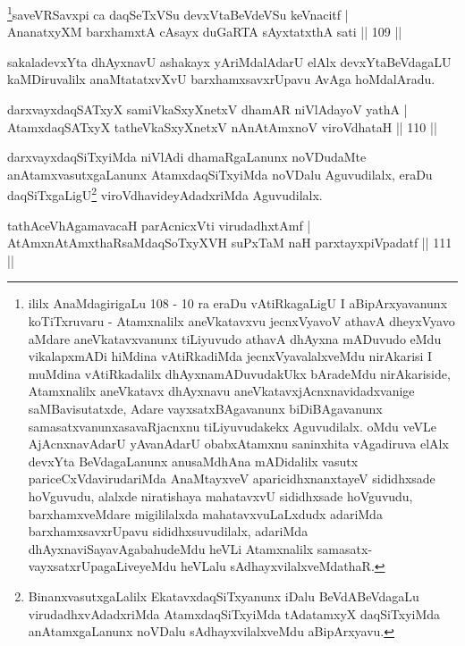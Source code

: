 \begin{shl}
\footnote{ililx AnaMdagirigaLu 108 - 10 ra eraDu vAtiRkagaLigU I aBipArxyavanunx koTiTxruvaru - Atamxnalilx aneVkatavxvu jecnxVyavoV athavA dheyxVyavo aMdare aneVkatavxvanunx tiLiyuvudo athavA dhAyxna mADuvudo eMdu vikalapxmADi hiMdina vAtiRkadiMda jecnxVyavalalxveMdu nirAkarisi I muMdina vAtiRkadalilx dhAyxnamADuvudakUkx bAradeMdu nirAkariside, Atamxnalilx aneVkatavx dhAyxnavu aneVkatavxjAcnxnavidadxvanige saMBavisutatxde, Adare vayxsatxBAgavanunx biDiBAgavanunx samasatxvanunx\break asavaRjacnxnu tiLiyuvudakekx Aguvudilalx. oMdu veVLe AjAcnxnavAdarU yAvanAdarU obabxAtamxnu saninxhita vAgadiruva elAlx devxYta BeVdagaLanunx anusaMdhAna mADidalilx vasutx pariceCxVdavirudariMda AnaMtayxveV aparicidhxnanxtayeV sididhxsade hoVguvudu, alalxde niratishaya mahatavxvU sididhxsade hoVguvudu, barxhamxveMdare migililalxda mahatavxvuLaLxdudx adariMda barxhamxsavxrUpavu sididhxsuvudilalx, adariMda dhAyxnaviSaya\-vAgabahudeMdu heVLi Atamxnalilx samasatx-vayxsatxrUpagaLiveyeMdu heVLalu sAdhayxvilalxveMdathaR.}saveVRSavxpi ca daqSeTxVSu devxVtaBeVdeVSu keVnacitf |\\
AnanatxyXM barxhamxtA cAsayx duGaRTA sAyxtatxthA sati \hfill || 109 ||
\end{shl}

\begin{artha}
sakaladevxYta dhAyxnavU ashakayx yAriMdalAdarU elAlx devxYtaBeVdagaLU kaMDiruvalilx anaMtatatxvXvU barxhamxsavxrUpavu AvAga hoMdalAradu.
\end{artha}

\begin{shl}
darxvayxdaqSATxyX samiVkaSxyXnetxV dhamAR niVlAdayoV yathA |\\
AtamxdaqSATxyX tatheVkaSxyXnetxV nAnAtAmxnoV viroVdhataH \hfill || 110 ||
\end{shl}

\begin{artha}
darxvayxdaqSiTxyiMda niVlAdi dhamaRgaLanunx noVDudaMte anAtamxvasutxgaLanunx AtamxdaqSiTxyiMda noVDalu Aguvudilalx, eraDu daqSiTxgaLigU\footnote{BinanxvasutxgaLalilx EkatavxdaqSiTxyanunx iDalu BeVdABeVdagaLu virudadhxvAdadxriMda AtamxdaqSiTxyiMda tAdatamxyX daqSiTxyiMda anAtamxgaLanunx noVDalu sAdhayxvilalxveMdu aBipArxyavu.} viroVdhavideyAdadxriMda Aguvudilalx.
\end{artha}


\begin{shl}
tathAceVhA\s \s gamavacaH parAcnicxVti virudadhxtAmf |\\
AtAmxnAtAmxthaRsaMdaqSoTxyXVH suPxTaM naH parxtayxpiVpadatf \hfill || 111 ||
\end{shl}

